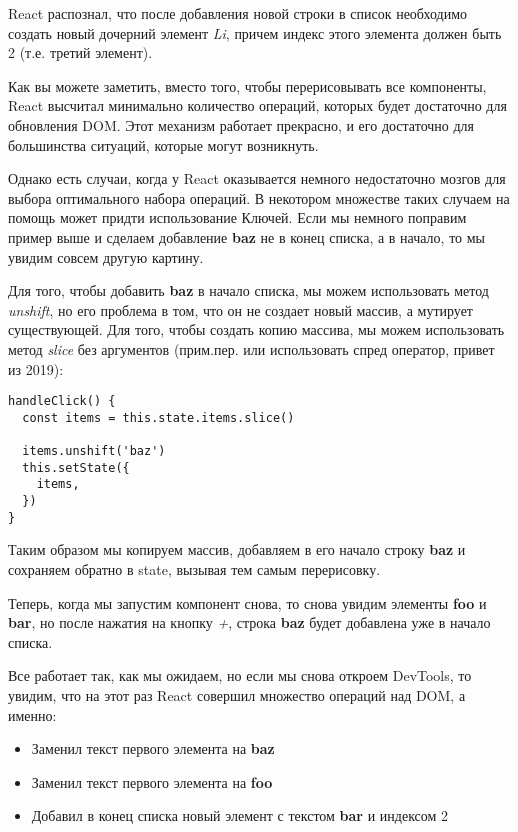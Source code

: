 React распознал, что после добавления новой строки в список необходимо создать новый дочерний элемент \textit{Li}, причем индекс этого элемента должен быть 2 (т.е. третий элемент).

Как вы можете заметить, вместо того, чтобы перерисовывать все компоненты, React высчитал минимально количество операций, которых будет достаточно для обновления DOM. Этот механизм работает прекрасно, и его достаточно для большинства ситуаций, которые могут возникнуть.

Однако есть случаи, когда у React оказывается немного недостаточно мозгов для выбора оптимального набора операций. В некотором множестве таких случаем на помощь может придти использование Ключей. Если мы немного поправим пример выше и сделаем добавление \textbf{baz} не в конец списка, а в начало, то мы увидим совсем другую картину. 

Для того, чтобы добавить \textbf{baz} в начало списка, мы можем использовать метод \textit{unshift}, но его проблема в том, что он не создает новый массив, а мутирует существующей. Для того, чтобы создать копию массива, мы можем использовать метод \textit{slice} без аргументов (прим.пер. или использовать спред оператор, привет из 2019):

\begin{lstlisting}
handleClick() {
  const items = this.state.items.slice()
  
  items.unshift('baz')
  this.setState({
    items,
  })
}
\end{lstlisting}

Таким образом мы копируем массив, добавляем в его начало строку \textbf{baz} и сохраняем обратно в state, вызывая тем самым перерисовку.

Теперь, когда мы запустим компонент снова, то снова увидим элементы \textbf{foo} и \textbf{bar}, но после нажатия на кнопку \textit{+}, строка \textbf{baz} будет добавлена уже в начало списка.

Все работает так, как мы ожидаем, но если мы снова откроем DevTools, то увидим, что на этот раз React совершил множество операций над DOM, а именно:

\begin{itemize}
  \item Заменил текст первого элемента на \textbf{baz}
  \item Заменил текст первого элемента на \textbf{foo}
  \item Добавил в конец списка новый элемент с текстом \textbf{bar} и индексом 2
\end{itemize}

